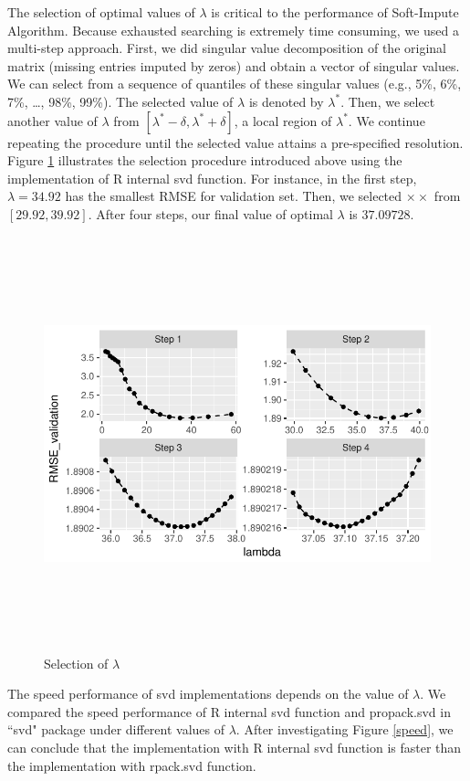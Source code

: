 \documentclass[12pt]{article}
\begin{document}
The selection of optimal values of $\lambda$ is critical to the performance of Soft-Impute Algorithm. Because exhausted searching is extremely time consuming, we used a multi-step approach. First, we did singular value decomposition of the original matrix (missing entries imputed by zeros) and obtain a vector of singular values. We can select from a sequence of quantiles of these singular values (e.g., 5\%, 6\%, 7\%, \ldots, 98\%, 99\%). The selected value of $\lambda$ is denoted by $\lambda^{*}$. Then, we select another value of $\lambda$ from $[\lambda^{*}-\delta, \lambda^{*}+\delta]$, a local region of $\lambda^{*}$. We continue repeating the procedure until the selected value attains a pre-specified resolution. Figure \ref{lambda} illustrates the selection procedure introduced above using the implementation of R internal svd function. For instance, in the first step, $\lambda = 34.92$ has the smallest RMSE for validation set. Then, we selected $\times\times$ from $[29.92, 39.92]$. After four steps, our final value of optimal $\lambda$ is $37.09728$.

\begin{figure}[ht]
	\includegraphics[width=16cm,height=12cm]{movie}
	\caption{Selection of $\lambda$}\label{lambda}
\end{figure}

The speed performance of svd implementations depends on the value of $\lambda$. We compared the speed performance of R internal svd function and propack.svd in ``svd" package under different values of $\lambda$. After investigating Figure \ref{speed}, we can conclude that the implementation with R internal svd function is faster than the implementation with rpack.svd function.
\end{document}
